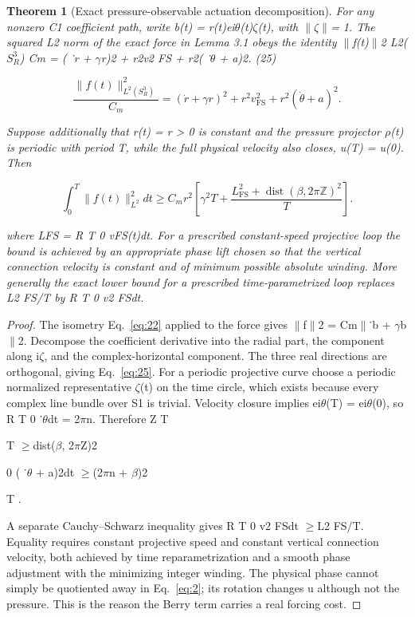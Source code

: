 \documentclass[10pt,letterpaper]{article}
\newtheorem{theorem}{Theorem}[section]
\theoremstyle{remark}
\begin{document}
\begin{theorem}[Exact pressure-observable actuation decomposition]

For any nonzero C1 coefficient path, write b(t) = r(t)ei\(\theta \)(t)\(\zeta \)(t), with \(\| \zeta \| \)= 1. The squared L2 norm of the exact force in Lemma 3.1 obeys the identity \(\| \)f(t)\(\| \)2 L2(\(S_R^3\)) Cm = ( ˙r + \(\gamma \)r)2 + r2v2 FS + r2( ˙\(\theta \) + a)2. (25)


\begin{equation}
\tag{25}\label{eq:25}
\frac{\|f(t)\|_{L^2(S_R^3)}^2}{C_m}=(\dot r+\gamma r)^2+r^2v_{\mathrm{FS}}^2+r^2(\dot\theta+a)^2.
\end{equation}

Suppose additionally that r(t) = r > 0 is constant and the pressure projector \(\rho \)(t) is periodic with period T, while the full physical velocity also closes, u(T) = u(0). Then



\begin{equation}
\tag{26}\label{eq:26}
\int_0^T\|f(t)\|_{L^2}^2dt\ge C_mr^2\left[\gamma^2T+\frac{L_{\mathrm{FS}}^2+\operatorname{dist}(\beta,2\pi\mathbb Z)^2}{T}\right].
\end{equation}

where LFS = R T 0 vFS(t)dt. For a prescribed constant-speed projective loop the bound is achieved by an appropriate phase lift chosen so that the vertical connection velocity is constant and of minimum possible absolute winding. More generally the exact lower bound for a prescribed time-parametrized loop replaces L2 FS/T by R T 0 v2 FSdt.


\end{theorem}

\begin{proof}
The isometry Eq.~\eqref{eq:22} applied to the force gives \(\| \)f\(\| \)2 = Cm\(\| \)˙b + \(\gamma \)b\(\| \)2. Decompose the coefficient derivative into the radial part, the component along i\(\zeta \), and the complex-horizontal component. The three real directions are orthogonal, giving Eq.~\eqref{eq:25}. For a periodic projective curve choose a periodic normalized representative \(\zeta \)(t) on the time circle, which exists because every complex line bundle over S1 is trivial. Velocity closure implies ei\(\theta \)(T) = ei\(\theta \)(0), so R T 0 ˙\(\theta \)dt = 2\(\pi \)n. Therefore Z T

T \(\ge \)dist(\(\beta \), 2\(\pi \)Z)2


0 ( ˙\(\theta \) + a)2dt \(\ge \)(2\(\pi \)n + \(\beta \))2


T .


A separate Cauchy–Schwarz inequality gives R T 0 v2 FSdt \(\ge \)L2 FS/T. Equality requires constant projective speed and constant vertical connection velocity, both achieved by time reparametrization and a smooth phase adjustment with the minimizing integer winding. The physical phase cannot simply be quotiented away in Eq.~\eqref{eq:2}; its rotation changes u although not the pressure. This is the reason the Berry term carries a real forcing cost.


\end{proof}
\end{document}
